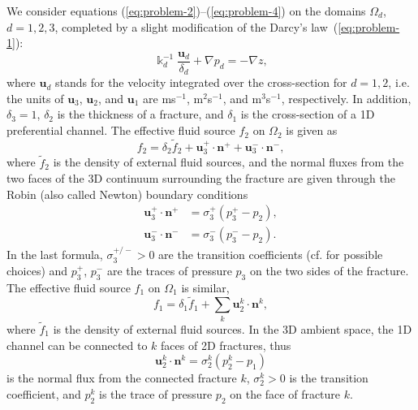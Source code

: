 We consider equations (\ref{eq:problem-2})--(\ref{eq:problem-4}) on the domains
$\Omega_{d}$, $d=1,2,3$, completed by a slight modification of the Darcy's
law~(\ref{eq:problem-1}):
\begin{equation}
\label{eq:darcy-law-fracture}
\Bbbk_{d}^{-1}\frac{\mathbf{u}_{d}}{\delta_{d}}+\nabla p_{d}=-\nabla z,
\end{equation}
where $\mathbf{u}_{d}$ stands for the 
velocity integrated over the cross-section for $d=1,2$,
i.e. the units of $\mathbf{u}_{3}$, $\mathbf{u}_{2}$, and $\mathbf{u}_{1}$ are ms$^{-1}$, m$^{2}$s$^{-1}$, and m$^{3}$s$^{-1}$, respectively.
In addition, $\delta_{3}=1$, $\delta_{2}$ is the thickness of a fracture, and $\delta_{1}$ is the cross-section of a 1D preferential channel.
The effective fluid source $f_{2}$
on $\Omega_{2}$ is given as
\begin{equation}
\label{eq:comm-term-2}
f_{2}=\delta_{2}\tilde{f}_{2}+\mathbf{u}_{3}^{+}\cdot\mathbf{n}^{+}%
+\mathbf{u}_{3}^{-}\cdot\mathbf{n}^{-},
\end{equation}
where 
$\tilde{f}_{2}$ is the
density of external fluid sources, and the normal fluxes from the two faces of the
3D continuum surrounding the fracture are given through the Robin (also called
Newton) boundary conditions
\begin{align}
\mathbf{u}_{3}^{+}\cdot\mathbf{n}^{+}  &  =\sigma_{3}^{+}(p_{3}^{+}%
-p_{2}),\label{eq:newton-1}\\
\mathbf{u}_{3}^{-}\cdot\mathbf{n}^{-}  &  =\sigma_{3}^{-}(p_{3}^{-}-p_{2}).
\label{eq:newton-2}%
\end{align}
In the last formula, $\sigma_{3}^{+/-}>0$ are the transition coefficients (cf.
\cite{Martin-2005-MFB} for possible choices) and $p_{3}^{+}$, $p_{3}^{-}$ are
the traces of pressure $p_{3}$ on the two sides of the fracture. The effective
fluid source $f_{1}$ on $\Omega_{1}$ is similar,
\begin{equation}
\label{eq:comm-term-1}
f_{1}=\delta_{1}\tilde{f}_{1}+\sum_{k}\mathbf{u}_{2}^{k}\cdot\mathbf{n}^{k},
\end{equation}
where 
$\tilde{f}_{1}$ is the density of external fluid sources. In the 3D ambient
space, the 1D channel can be connected to $k$ faces of 2D fractures, thus
\begin{equation}
\mathbf{u}_{2}^{k}\cdot\mathbf{n}^{k}=\sigma_{2}^{k}(p_{2}^{k}-p_{1})
\label{eq:newton-3}%
\end{equation}
is the normal flux from the connected fracture $k$, $\sigma_{2}^{k}>0$ is the transition
coefficient, and $p_{2}^{k}$ is the trace of pressure $p_{2}$ on the face of
fracture $k$.

